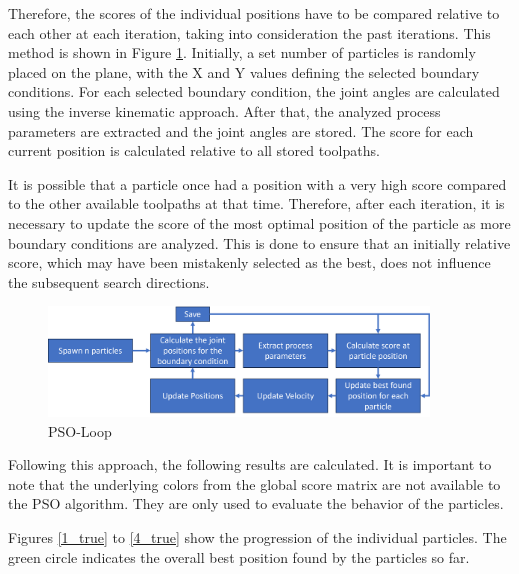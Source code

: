 Therefore, the scores of the individual positions have to be compared relative to each other at each iteration, taking into consideration the past iterations. This method is shown in Figure \ref{swarmloop}. Initially, a set number of particles is randomly placed on the plane, with the X and Y values defining the selected boundary conditions. For each selected boundary condition, the joint angles are calculated using the inverse kinematic approach. After that, the analyzed process parameters are extracted and the joint angles are stored. The score for each current position is calculated relative to all stored toolpaths.

It is possible that a particle once had a position with a very high score compared to the other available toolpaths at that time. Therefore, after each iteration, it is necessary to update the score of the most optimal position of the particle as more boundary conditions are analyzed. This is done to ensure that an initially relative score, which may have been mistakenly selected as the best, does not influence the subsequent search directions.

\begin{figure}[H]
	\centerline{\includegraphics[width=0.9\textwidth]{figures/swarmloop.png}}
	\caption{PSO-Loop}
	\label{swarmloop}
\end{figure}

Following this approach, the following results are calculated. It is important to note that the underlying colors from the global score matrix are not available to the PSO algorithm. They are only used to evaluate the behavior of the particles.

Figures \ref{1_true} to \ref{4_true} show the progression of the individual particles. The green circle indicates the overall best position found by the particles so far.

